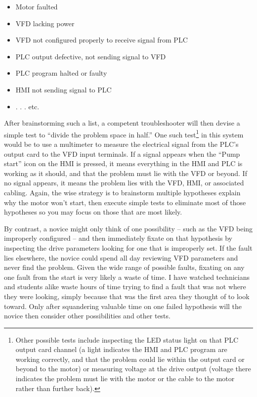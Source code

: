 \begin{itemize}
\item Motor faulted
\item VFD lacking power
\item VFD not configured properly to receive signal from PLC
\item PLC output defective, not sending signal to VFD
\item PLC program halted or faulty
\item HMI not sending signal to PLC
\item . . . etc.
\end{itemize}

After brainstorming such a list, a competent troubleshooter will then devise a simple test to ``divide the problem space in half.''  One such test\footnote{Other possible tests include inspecting the LED status light on that PLC output card channel (a light indicates the HMI and PLC program are working correctly, and that the problem could lie within the output card or beyond to the motor) or measuring voltage at the drive output (voltage there indicates the problem must lie with the motor or the cable to the motor rather than further back).} in this system would be to use a multimeter to measure the electrical signal from the PLC's output card to the VFD input terminals.  If a signal appears when the ``Pump start'' icon on the HMI is pressed, it means everything in the HMI and PLC is working as it should, and that the problem must lie with the VFD or beyond.  If no signal appears, it means the problem lies with the VFD, HMI, or associated cabling.  Again, the wise strategy is to brainstorm multiple hypotheses explain why the motor won't start, then execute simple tests to eliminate most of those hypotheses so you may focus on those that are most likely.

By contrast, a novice might only think of one possibility -- such as the VFD being improperly configured -- and then immediately fixate on that hypothesis by inspecting the drive parameters looking for one that is improperly set.  If the fault lies elsewhere, the novice could spend all day reviewing VFD parameters and never find the problem.  Given the wide range of possible faults, fixating on any one fault from the start is very likely a waste of time.  I have watched technicians and students alike waste hours of time trying to find a fault that was not where they were looking, simply because that was the first area they thought of to look toward.  Only after squandering valuable time on one failed hypothesis will the novice then consider other possibilities and other tests.





